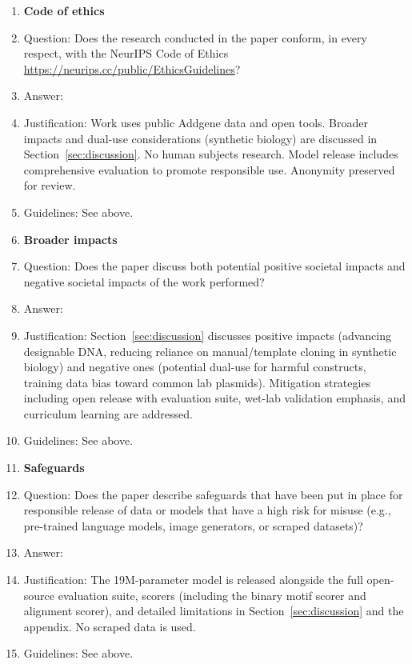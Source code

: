\begin{enumerate}
\item {\bf Code of ethics}
    \item[] Question: Does the research conducted in the paper conform, in every respect, with the NeurIPS Code of Ethics \url{https://neurips.cc/public/EthicsGuidelines}?
    \item[] Answer: \answerYes{}
    \item[] Justification: Work uses public Addgene data and open tools. Broader impacts and dual-use considerations (synthetic biology) are discussed in Section~\ref{sec:discussion}. No human subjects research. Model release includes comprehensive evaluation to promote responsible use. Anonymity preserved for review.
    \item[] Guidelines: See above.


\item {\bf Broader impacts}
    \item[] Question: Does the paper discuss both potential positive societal impacts and negative societal impacts of the work performed?
    \item[] Answer: \answerYes{}
    \item[] Justification: Section~\ref{sec:discussion} discusses positive impacts (advancing designable DNA, reducing reliance on manual/template cloning in synthetic biology) and negative ones (potential dual-use for harmful constructs, training data bias toward common lab plasmids). Mitigation strategies including open release with evaluation suite, wet-lab validation emphasis, and curriculum learning are addressed.
    \item[] Guidelines: See above.
    
\item {\bf Safeguards}
    \item[] Question: Does the paper describe safeguards that have been put in place for responsible release of data or models that have a high risk for misuse (e.g., pre-trained language models, image generators, or scraped datasets)?
    \item[] Answer: \answerYes{}
    \item[] Justification: The 19M-parameter model is released alongside the full open-source evaluation suite, scorers (including the binary motif scorer and alignment scorer), and detailed limitations in Section~\ref{sec:discussion} and the appendix. No scraped data is used.
    \item[] Guidelines: See above.


\end{enumerate}
